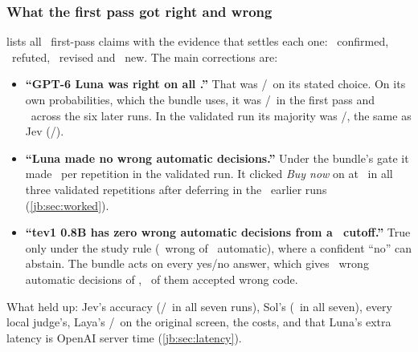 \subsubsection{What the first pass got right and wrong}

 lists all \ChangesN\ first-pass claims with the evidence that settles each one:
\ChangesConfirmed\ confirmed, \ChangesRefuted\ refuted, \ChangesRevised\ revised and \ChangesNew\ new.
The main corrections are:
\begin{itemize}
  \item \textbf{``GPT-6 Luna was right on all \DevN.''} That was \FpLunaStudyK/\DevN\ on its stated
    choice. On its own probabilities, which the bundle uses, it was \FpLunaArgmaxK/\DevN\ in the first
    pass and \LunaSixRunRange\ across the six later runs. In the validated run its majority was
    \LunaDevAccK/\DevN, the same as Jev (\JevDevAccK/\DevN).
  \item \textbf{``Luna made no wrong automatic decisions.''} Under the bundle's gate it made
    \LunaDevWaRange\ per repetition in the validated run. It clicked \emph{Buy now} on 
    at \ExLunaPRange\ in all three validated repetitions after deferring in the \ExLunaFpRuns\ earlier runs
    (\cref{jb:sec:worked}).
  \item \textbf{``tev1 0.8B has zero wrong automatic decisions from a \FpCutoff\ cutoff.''} True only under
    the study rule (\FpTevPtEightCutWa\ wrong of \FpTevPtEightCutAuto\ automatic), where a confident
    ``no'' can abstain. The bundle acts on every yes/no answer, which gives \FpTevPtEightBundleWa\ wrong
    automatic decisions of \DevN, \TevPtEightDevAwc\ of them accepted wrong code.
\end{itemize}
What held up: Jev's accuracy (\JevSevenRunRange/\DevN\ in all seven runs), Sol's (\SolSevenRunRange\ in
all seven), every local judge's, Laya's \LayaOriginalK/\LayaOriginalN\ on the original screen, the
costs, and that Luna's extra latency is OpenAI server time (\cref{jb:sec:latency}).

{\small
\setlength{\tabcolsep}{4pt}
\renewcommand{\arraystretch}{1.1}
\FloatBarrier

\FloatBarrier
}
